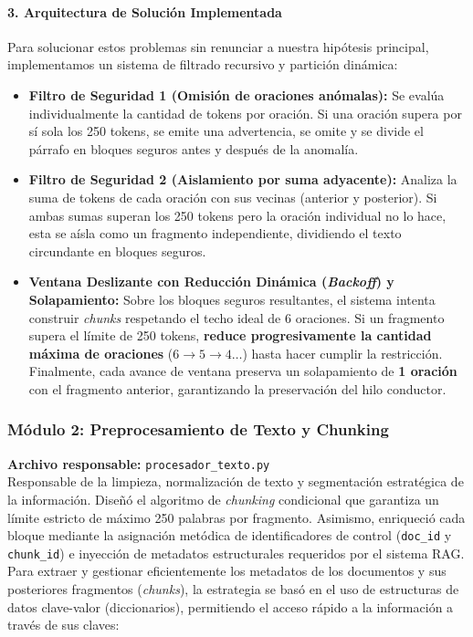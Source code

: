 \documentclass[12pt,a4paper]{article}
\begin{document}
\paragraph{3. Arquitectura de Solución Implementada}
Para solucionar estos problemas sin renunciar a nuestra hipótesis principal, implementamos un sistema de filtrado recursivo y partición dinámica:
\begin{itemize}
    \item \textbf{Filtro de Seguridad 1 (Omisión de oraciones anómalas):} Se evalúa individualmente la cantidad de tokens por oración. Si una oración supera por sí sola los 250 tokens, se emite una advertencia, se omite y se divide el párrafo en bloques seguros antes y después de la anomalía.
    \item \textbf{Filtro de Seguridad 2 (Aislamiento por suma adyacente):} Analiza la suma de tokens de cada oración con sus vecinas (anterior y posterior). Si ambas sumas superan los 250 tokens pero la oración individual no lo hace, esta se aísla como un fragmento independiente, dividiendo el texto circundante en bloques seguros.
    \item \textbf{Ventana Deslizante con Reducción Dinámica (\textit{Backoff}) y Solapamiento:} Sobre los bloques seguros resultantes, el sistema intenta construir \textit{chunks} respetando el techo ideal de 6 oraciones. Si un fragmento supera el límite de 250 tokens, \textbf{reduce progresivamente la cantidad máxima de oraciones} ($6 \rightarrow 5 \rightarrow 4 \dots$) hasta hacer cumplir la restricción. Finalmente, cada avance de ventana preserva un solapamiento de \textbf{1 oración} con el fragmento anterior, garantizando la preservación del hilo conductor.
\end{itemize}

\subsubsection{Módulo 2: Preprocesamiento de Texto y Chunking}
\textbf{Archivo responsable:} \texttt{procesador\_texto.py}\\
Responsable de la limpieza, normalización de texto y segmentación estratégica de la información. Diseñó el algoritmo de \textit{chunking} condicional que garantiza un límite estricto de máximo 250 palabras por fragmento. Asimismo, enriqueció cada bloque mediante la asignación metódica de identificadores de control (\texttt{doc\_id} y \texttt{chunk\_id}) e inyección de metadatos estructurales requeridos por el sistema RAG.
Para extraer y gestionar eficientemente los metadatos de los documentos y sus posteriores fragmentos (\textit{chunks}), la estrategia se basó en el uso de estructuras de datos clave-valor (diccionarios), permitiendo el acceso rápido a la información a través de sus claves:
\end{document}
